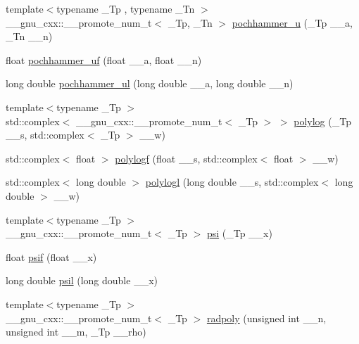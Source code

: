 \begin{DoxyCompactItemize}
\item 
{\footnotesize template$<$typename \+\_\+\+Tp , typename \+\_\+\+Tn $>$ }\\\+\_\+\+\_\+gnu\+\_\+cxx\+::\+\_\+\+\_\+promote\+\_\+num\+\_\+t$<$ \+\_\+\+Tp, \+\_\+\+Tn $>$ \hyperlink{namespace____gnu__cxx_a4cadb141501737e85c8d6511fe3d3b94}{pochhammer\+\_\+u} (\+\_\+\+Tp \+\_\+\+\_\+a, \+\_\+\+Tn \+\_\+\+\_\+n)
\item 
float \hyperlink{namespace____gnu__cxx_a520a93cbd1963b22679e865f29f36331}{pochhammer\+\_\+uf} (float \+\_\+\+\_\+a, float \+\_\+\+\_\+n)
\item 
long double \hyperlink{namespace____gnu__cxx_a169c9e8f9d84e51187a0fe4ecaba0947}{pochhammer\+\_\+ul} (long double \+\_\+\+\_\+a, long double \+\_\+\+\_\+n)
\item 
{\footnotesize template$<$typename \+\_\+\+Tp $>$ }\\std\+::complex$<$ \+\_\+\+\_\+gnu\+\_\+cxx\+::\+\_\+\+\_\+promote\+\_\+num\+\_\+t$<$ \+\_\+\+Tp $>$ $>$ \hyperlink{namespace____gnu__cxx_afbe8ee0e3edd53cd5cd421e9b913f6b9}{polylog} (\+\_\+\+Tp \+\_\+\+\_\+s, std\+::complex$<$ \+\_\+\+Tp $>$ \+\_\+\+\_\+w)
\item 
std\+::complex$<$ float $>$ \hyperlink{namespace____gnu__cxx_a5376edb72358b777035a78b929deb49f}{polylogf} (float \+\_\+\+\_\+s, std\+::complex$<$ float $>$ \+\_\+\+\_\+w)
\item 
std\+::complex$<$ long double $>$ \hyperlink{namespace____gnu__cxx_a9eb79e506eda210610bc59c1912b4d0f}{polylogl} (long double \+\_\+\+\_\+s, std\+::complex$<$ long double $>$ \+\_\+\+\_\+w)
\item 
{\footnotesize template$<$typename \+\_\+\+Tp $>$ }\\\+\_\+\+\_\+gnu\+\_\+cxx\+::\+\_\+\+\_\+promote\+\_\+num\+\_\+t$<$ \+\_\+\+Tp $>$ \hyperlink{namespace____gnu__cxx_a850cdad2e428a553e5adf2474a6a385a}{psi} (\+\_\+\+Tp \+\_\+\+\_\+x)
\item 
float \hyperlink{namespace____gnu__cxx_a47ae74abfaa3f549eed4a87b1b63449d}{psif} (float \+\_\+\+\_\+x)
\item 
long double \hyperlink{namespace____gnu__cxx_aaf230aedcb20a1c5a43fc71132bb0dc1}{psil} (long double \+\_\+\+\_\+x)
\item 
{\footnotesize template$<$typename \+\_\+\+Tp $>$ }\\\+\_\+\+\_\+gnu\+\_\+cxx\+::\+\_\+\+\_\+promote\+\_\+num\+\_\+t$<$ \+\_\+\+Tp $>$ \hyperlink{namespace____gnu__cxx_a2a415dff236d6e4c36150bd5958eaf78}{radpoly} (unsigned int \+\_\+\+\_\+n, unsigned int \+\_\+\+\_\+m, \+\_\+\+Tp \+\_\+\+\_\+rho)

\end{DoxyCompactItemize}
